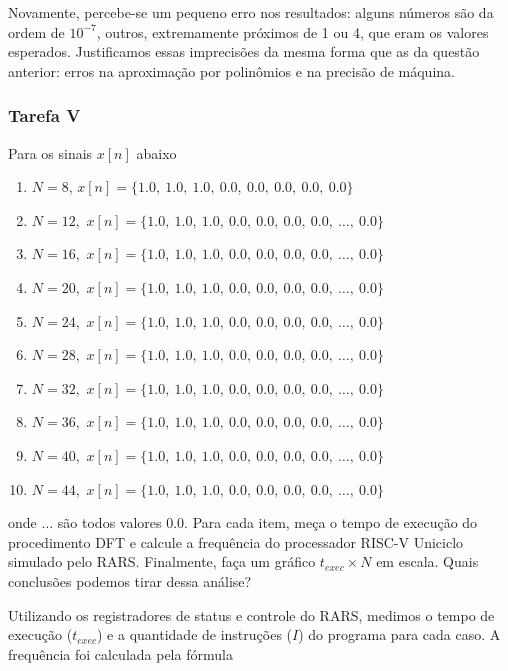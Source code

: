 \documentclass[a4paper,12pt]{article}
\begin{document}
Novamente, percebe-se um pequeno erro nos resultados: alguns números são da ordem de $10^{-7}$, outros, extremamente próximos de 1 ou 4, que eram os valores esperados. Justificamos essas imprecisões da mesma forma que as da questão anterior: erros na aproximação por polinômios e na precisão de máquina.

\subsubsection{Tarefa V}
\begin{tcolorbox}[title=Enunciado, colback=blue!5!white, colframe=blue!75!black]
Para os sinais $x[n]$ abaixo
\begin{enumerate}[label=\alph*), itemsep=0pt]
    \item $N=8$, $x[n]=\{1.0,\ 1.0,\ 1.0,\ 0.0,\ 0.0,\ 0.0,\ 0.0 ,\ 0.0\} $
    \item $N=12$,\ $x[n]=\{1.0,\ 1.0,\ 1.0,\ 0.0,\ 0.0,\ 0.0,\ 0.0 ,\ \dots,\ 0.0\}$ 
    \item $N=16$,\ $x[n]=\{1.0,\ 1.0,\ 1.0,\ 0.0,\ 0.0,\ 0.0,\ 0.0 ,\ \dots,\ 0.0\}$ 
    \item $N=20$,\ $x[n]=\{1.0,\ 1.0,\ 1.0,\ 0.0,\ 0.0,\ 0.0,\ 0.0 ,\ \dots,\ 0.0\}$ 
    \item $N=24$,\ $x[n]=\{1.0,\ 1.0,\ 1.0,\ 0.0,\ 0.0,\ 0.0,\ 0.0 ,\ \dots,\ 0.0\}$ 
    \item $N=28$,\ $x[n]=\{1.0,\ 1.0,\ 1.0,\ 0.0,\ 0.0,\ 0.0,\ 0.0 ,\ \dots,\ 0.0\}$ 
    \item $N=32$,\ $x[n]=\{1.0,\ 1.0,\ 1.0,\ 0.0,\ 0.0,\ 0.0,\ 0.0 ,\ \dots,\ 0.0\}$ 
    \item $N=36$,\ $x[n]=\{1.0,\ 1.0,\ 1.0,\ 0.0,\ 0.0,\ 0.0,\ 0.0 ,\ \dots,\ 0.0\}$ 
    \item $N=40$,\ $x[n]=\{1.0,\ 1.0,\ 1.0,\ 0.0,\ 0.0,\ 0.0,\ 0.0 ,\ \dots,\ 0.0\}$ 
    \item $N=44$,\ $x[n]=\{1.0,\ 1.0,\ 1.0,\ 0.0,\ 0.0,\ 0.0,\ 0.0 ,\ \dots,\ 0.0\}$
\end{enumerate}
onde $\dots$ são todos valores 0.0. Para cada item, meça o tempo de execução do procedimento DFT e calcule a frequência do processador RISC-V Uniciclo simulado pelo RARS. Finalmente, faça um gráfico $t_{exec} \times N$ em escala. Quais conclusões podemos tirar dessa análise?
\end{tcolorbox}
Utilizando os registradores de status e controle do RARS, medimos o tempo de execução ($t_{exec}$) e a quantidade de instruções ($I$) do programa para cada caso. A frequência foi calculada pela fórmula
\end{document}
